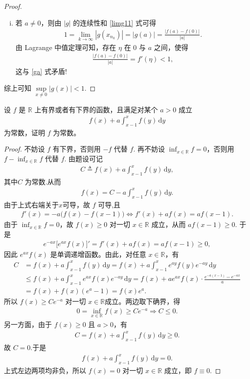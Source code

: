 \documentclass[../../main.tex]{subfiles}%
\begin{document}
\begin{proof}
\begin{enumerate}[(i)]
\item 若 $a \ne 0$，则由 $|g|$ 的连续性和 \eqref{limg11} 式可得
\begin{align}
1 = \lim_{k \to \infty} |g(x_{n_k})| = |g(a)| = \frac{|f(a) - f(0)|}{|a|}. \label{ga}
\end{align}
由 Lagrange 中值定理可知，存在 $\eta$ 在 $0$ 与 $a$ 之间，使得
\begin{align*}
\frac{|f(a) - f(0)|}{|a|} = f'(\eta) < 1,
\end{align*}
这与 \eqref{ga} 式矛盾!
\end{enumerate}
综上可知 $\sup\limits_{x \ne 0} |g(x)| < 1$.
\end{proof}

\begin{example}
设 $f$ 是 $\mathbb{R}$ 上有界或者有下界的函数，且满足对某个 $a>0$ 成立
\begin{align*}
f(x)+a\int_{x-1}^{x}f(y)\,\mathrm{d}y
\end{align*}
为常数，证明 $f$ 为常数。
\end{example}
\begin{proof}
不妨设 $f$ 有下界，否则用 $-f$ 代替 $f$. 再不妨设 $\inf_{x\in\mathbb{R}}f=0$，否则用 $f-\inf_{x\in\mathbb{R}}f$ 代替 $f$. 由题设可记
\begin{align*}
C\triangleq f(x)+a\int_{x-1}^{x}f(y)\,\mathrm{d}y,
\end{align*}
其中$C$ 为常数.从而
\begin{align*}
f(x)=C-a\int_{x-1}^{x}f(y)\,\mathrm{d}y.
\end{align*}
由于上式右端关于$x$可导，故 $f$ 可导,且
\begin{align*}
f'(x)=-a\bigl(f(x)-f(x-1)\bigr)\iff f'(x)+af(x)=af(x-1).
\end{align*}
由于 $\inf_{x\in\mathbb{R}}f=0$，故 $f(x)\geqslant 0$ 对一切 $x\in\mathbb{R}$ 成立，从而 $af(x-1)\geqslant 0$. 于是
\begin{align*}
e^{-ax}\bigl[e^{ax}f(x)\bigr]'=f'(x)+af(x)=af(x-1)\geqslant 0,
\end{align*}
因此 $e^{ax}f(x)$ 是单调递增函数。由此，对任意 $x\in\mathbb{R}$，有
\begin{align*}
C&=f(x)+a\int_{x-1}^{x}f(y)\,\mathrm{d}y =f(x)+a\int_{x-1}^{x}e^{ay}f(y)e^{-ay}\,\mathrm{d}y \\
&\leqslant f(x)+a\int_{x-1}^{x}e^{ax}f(x)e^{-ay}\,\mathrm{d}y =f(x)+a e^{ax}f(x)\cdot \frac{e^{-a(x-1)}-e^{-ax}}{a} \\
&=f(x)+f(x)(e^{a}-1)=f(x)e^{a}.
\end{align*}
所以 $f(x)\geqslant C e^{-a}$ 对一切 $x\in \mathbb{R}$成立。两边取下确界，得
\begin{align*}
0=\inf_{x\in\mathbb{R}} f(x)\geqslant C e^{-a}\Longrightarrow C\leqslant 0.
\end{align*}
另一方面，由于 $f(x)\geqslant 0$ 且 $a>0$，有
\begin{align*}
C=f(x)+a\int_{x-1}^{x}f(y)\,\mathrm{d}y\geqslant 0.
\end{align*}
故 $C=0$.于是
\begin{align*}
f(x)+a\int_{x-1}^{x}f(y)\,\mathrm{d}y=0.
\end{align*}
上式左边两项均非负，所以 $f(x)=0$ 对一切 $x\in \mathbb{R}$ 成立，即 $f\equiv 0$.
\end{proof}
\end{document}
